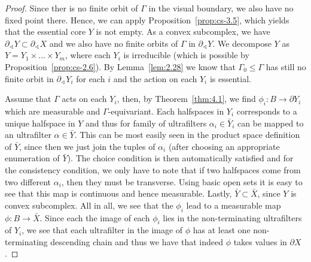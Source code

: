 \begin{proof}
  Since ther is no finite orbit of \(\Gamma\) in the visual boundary, we also have no fixed point there. Hence, we can apply Proposition~\ref{prop:cs-3.5}, which yields that the essential core \(Y\) is not empty. As a convex subcomplex, we have \(\partial_\sphericalangle Y \subset \partial_\sphericalangle X\) and we also have no finite orbits of \(\Gamma\) in \(\partial_\sphericalangle Y\). We decompose \(Y\) as \(Y = Y_1 \times \dots \times Y_m\), where each \(Y_i\) is irreducible (which is possible by Proposition~\ref{prop:cs-2.6}). By Lemma~\ref{lem:2.28} we know that \(\Gamma_0 \leq \Gamma\) has still no finite orbit in \(\partial_\sphericalangle Y_i\) for each \(i\) and the action on each \(Y_i\) is essential.

  Assume that \(\Gamma\) acts on each \(Y_i\), then, by Theorem~\ref{thm:4.1}, we find \(\phi_i \colon B \to \partial Y_i\) which are measurable and \(\Gamma\)-equivariant. Each halfspaces in \(Y_i\) corresponds to a unique halfspace in \(Y\) and thus for family of ultrafilters \(\alpha_i \in \bar Y_i\) can be mapped to an ultrafilter \(\alpha \in \bar Y\). This can be most easily seen in the product space definition of \(\bar Y\), since then we just join the tuples of \(\alpha_i\) (after choosing an appropriate enumeration of \(\bar Y\)). The choice condition is then automatically satisfied and for the consistency condition, we only have to note that if two halfspaces come from two different \(\alpha_i\), then they must be transverse. Using basic open sets it is easy to see that this map is continuous and hence measurable. Lastly, \(\bar Y \subset \bar X\), since \(Y\) is convex subcomplex. All in all, we see that the \(\phi_i\) lead to a measurable map \(\phi\colon B \to \bar X\). Since each the image of each \(\phi_i\) lies in the non-terminating ultrafilters of \(Y_i\), we see that each ultrafilter in the image of \(\phi\) has at least one non-terminating descending chain and thus we have that indeed \(\phi\) takes values in \(\partial X\).
\end{proof}

